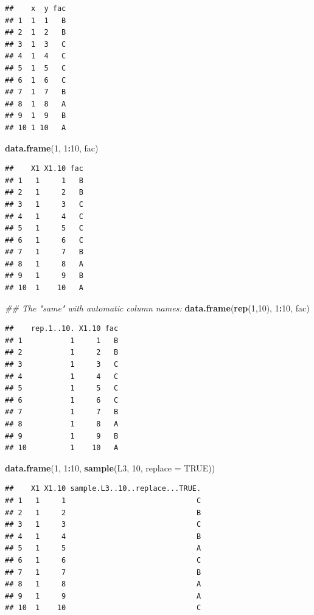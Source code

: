\documentclass[]{book}
\newenvironment{Shaded}{\begin{snugshade}}{\end{snugshade}}
\newcommand{\CommentTok}[1]{\textcolor[rgb]{0.56,0.35,0.01}{\textit{#1}}}
\newcommand{\DataTypeTok}[1]{\textcolor[rgb]{0.13,0.29,0.53}{#1}}
\newcommand{\DecValTok}[1]{\textcolor[rgb]{0.00,0.00,0.81}{#1}}
\newcommand{\KeywordTok}[1]{\textcolor[rgb]{0.13,0.29,0.53}{\textbf{#1}}}
\newcommand{\NormalTok}[1]{#1}
\newcommand{\OperatorTok}[1]{\textcolor[rgb]{0.81,0.36,0.00}{\textbf{#1}}}
\newcommand{\OtherTok}[1]{\textcolor[rgb]{0.56,0.35,0.01}{#1}}
\begin{document}
\begin{verbatim}
##    x  y fac
## 1  1  1   B
## 2  1  2   B
## 3  1  3   C
## 4  1  4   C
## 5  1  5   C
## 6  1  6   C
## 7  1  7   B
## 8  1  8   A
## 9  1  9   B
## 10 1 10   A
\end{verbatim}

\begin{Shaded}
\begin{Highlighting}[]
\KeywordTok{data.frame}\NormalTok{(}\DecValTok{1}\NormalTok{, }\DecValTok{1}\OperatorTok{:}\DecValTok{10}\NormalTok{, fac)}
\end{Highlighting}
\end{Shaded}

\begin{verbatim}
##    X1 X1.10 fac
## 1   1     1   B
## 2   1     2   B
## 3   1     3   C
## 4   1     4   C
## 5   1     5   C
## 6   1     6   C
## 7   1     7   B
## 8   1     8   A
## 9   1     9   B
## 10  1    10   A
\end{verbatim}

\begin{Shaded}
\begin{Highlighting}[]
\CommentTok{## The "same" with automatic column names:}
\KeywordTok{data.frame}\NormalTok{(}\KeywordTok{rep}\NormalTok{(}\DecValTok{1}\NormalTok{,}\DecValTok{10}\NormalTok{), }\DecValTok{1}\OperatorTok{:}\DecValTok{10}\NormalTok{, fac)}
\end{Highlighting}
\end{Shaded}

\begin{verbatim}
##    rep.1..10. X1.10 fac
## 1           1     1   B
## 2           1     2   B
## 3           1     3   C
## 4           1     4   C
## 5           1     5   C
## 6           1     6   C
## 7           1     7   B
## 8           1     8   A
## 9           1     9   B
## 10          1    10   A
\end{verbatim}

\begin{Shaded}
\begin{Highlighting}[]
\KeywordTok{data.frame}\NormalTok{(}\DecValTok{1}\NormalTok{, }\DecValTok{1}\OperatorTok{:}\DecValTok{10}\NormalTok{, }\KeywordTok{sample}\NormalTok{(L3, }\DecValTok{10}\NormalTok{, }\DataTypeTok{replace =} \OtherTok{TRUE}\NormalTok{))}
\end{Highlighting}
\end{Shaded}

\begin{verbatim}
##    X1 X1.10 sample.L3..10..replace...TRUE.
## 1   1     1                              C
## 2   1     2                              B
## 3   1     3                              C
## 4   1     4                              B
## 5   1     5                              A
## 6   1     6                              C
## 7   1     7                              B
## 8   1     8                              A
## 9   1     9                              A
## 10  1    10                              C
\end{verbatim}
\end{document}

